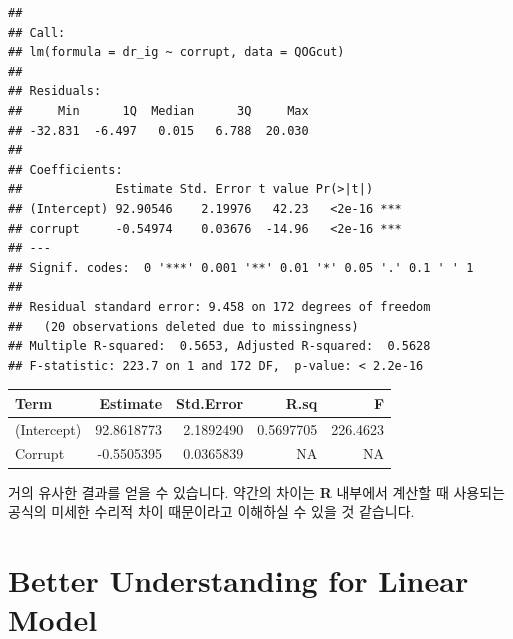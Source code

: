 \documentclass[]{book}
\newenvironment{Shaded}{\begin{snugshade}}{\end{snugshade}}
\newcommand{\DataTypeTok}[1]{\textcolor[rgb]{0.13,0.29,0.53}{#1}}
\newcommand{\KeywordTok}[1]{\textcolor[rgb]{0.13,0.29,0.53}{\textbf{#1}}}
\newcommand{\NormalTok}[1]{#1}
\newcommand{\OperatorTok}[1]{\textcolor[rgb]{0.81,0.36,0.00}{\textbf{#1}}}
\newcommand{\OtherTok}[1]{\textcolor[rgb]{0.56,0.35,0.01}{#1}}
\newcommand{\StringTok}[1]{\textcolor[rgb]{0.31,0.60,0.02}{#1}}
\begin{document}
\begin{verbatim}
## 
## Call:
## lm(formula = dr_ig ~ corrupt, data = QOGcut)
## 
## Residuals:
##     Min      1Q  Median      3Q     Max 
## -32.831  -6.497   0.015   6.788  20.030 
## 
## Coefficients:
##             Estimate Std. Error t value Pr(>|t|)    
## (Intercept) 92.90546    2.19976   42.23   <2e-16 ***
## corrupt     -0.54974    0.03676  -14.96   <2e-16 ***
## ---
## Signif. codes:  0 '***' 0.001 '**' 0.01 '*' 0.05 '.' 0.1 ' ' 1
## 
## Residual standard error: 9.458 on 172 degrees of freedom
##   (20 observations deleted due to missingness)
## Multiple R-squared:  0.5653, Adjusted R-squared:  0.5628 
## F-statistic: 223.7 on 1 and 172 DF,  p-value: < 2.2e-16
\end{verbatim}

\begin{Shaded}
\end{Shaded}

\begin{tabular}{l|r|r|r|r}
\hline
Term & Estimate & Std.Error & R.sq & F\\
\hline
(Intercept) & 92.8618773 & 2.1892490 & 0.5697705 & 226.4623\\
\hline
Corrupt & -0.5505395 & 0.0365839 & NA & NA\\
\hline
\end{tabular}

거의 유사한 결과를 얻을 수 있습니다. 약간의 차이는 \textbf{R} 내부에서 계산할 때 사용되는 공식의 미세한 수리적 차이 때문이라고 이해하실 수 있을 것 같습니다.

\hypertarget{better-understanding-for-linear-model}{%
\chapter{Better Understanding for Linear Model}\label{better-understanding-for-linear-model}}
\end{document}
